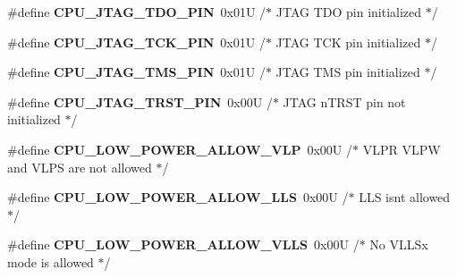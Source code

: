 \begin{DoxyCompactItemize}
\item 
\#define {\bfseries C\+P\+U\+\_\+\+J\+T\+A\+G\+\_\+\+T\+D\+O\+\_\+\+P\+IN}~0x01\+U     /$\ast$ J\+T\+A\+G T\+D\+O pin initialized $\ast$/\hypertarget{group___c_p_u___config__module_ga962b1ce7e7ef74f6336cef673915f776}{}\label{group___c_p_u___config__module_ga962b1ce7e7ef74f6336cef673915f776}

\item 
\#define {\bfseries C\+P\+U\+\_\+\+J\+T\+A\+G\+\_\+\+T\+C\+K\+\_\+\+P\+IN}~0x01\+U     /$\ast$ J\+T\+A\+G T\+C\+K pin initialized $\ast$/\hypertarget{group___c_p_u___config__module_ga10053a74191b250bf9a0ef22b9a87926}{}\label{group___c_p_u___config__module_ga10053a74191b250bf9a0ef22b9a87926}

\item 
\#define {\bfseries C\+P\+U\+\_\+\+J\+T\+A\+G\+\_\+\+T\+M\+S\+\_\+\+P\+IN}~0x01\+U     /$\ast$ J\+T\+A\+G T\+M\+S pin initialized $\ast$/\hypertarget{group___c_p_u___config__module_ga912a9e32c6bc39adda73d555e3cd82b7}{}\label{group___c_p_u___config__module_ga912a9e32c6bc39adda73d555e3cd82b7}

\item 
\#define {\bfseries C\+P\+U\+\_\+\+J\+T\+A\+G\+\_\+\+T\+R\+S\+T\+\_\+\+P\+IN}~0x00\+U     /$\ast$ J\+T\+A\+G n\+T\+R\+S\+T pin not initialized $\ast$/\hypertarget{group___c_p_u___config__module_ga45eb967e938c00389fe42d6ca9c17ce7}{}\label{group___c_p_u___config__module_ga45eb967e938c00389fe42d6ca9c17ce7}

\item 
\#define {\bfseries C\+P\+U\+\_\+\+L\+O\+W\+\_\+\+P\+O\+W\+E\+R\+\_\+\+A\+L\+L\+O\+W\+\_\+\+V\+LP}~0x00\+U     /$\ast$ V\+L\+P\+R V\+L\+P\+W and V\+L\+P\+S are not allowed $\ast$/\hypertarget{group___c_p_u___config__module_ga5e95e45c331e4e0028c448900b88ffde}{}\label{group___c_p_u___config__module_ga5e95e45c331e4e0028c448900b88ffde}

\item 
\#define {\bfseries C\+P\+U\+\_\+\+L\+O\+W\+\_\+\+P\+O\+W\+E\+R\+\_\+\+A\+L\+L\+O\+W\+\_\+\+L\+LS}~0x00\+U     /$\ast$ L\+L\+S isn\textquotesingle{}t allowed $\ast$/\hypertarget{group___c_p_u___config__module_gae3ea434795a7aafaa41466266fb7ccdb}{}\label{group___c_p_u___config__module_gae3ea434795a7aafaa41466266fb7ccdb}

\item 
\#define {\bfseries C\+P\+U\+\_\+\+L\+O\+W\+\_\+\+P\+O\+W\+E\+R\+\_\+\+A\+L\+L\+O\+W\+\_\+\+V\+L\+LS}~0x00\+U     /$\ast$ No V\+L\+L\+Sx mode is allowed $\ast$/\hypertarget{group___c_p_u___config__module_ga2d39deaf74942754f145cdbaccc7c8d4}{}\label{group___c_p_u___config__module_ga2d39deaf74942754f145cdbaccc7c8d4}


\end{DoxyCompactItemize}
